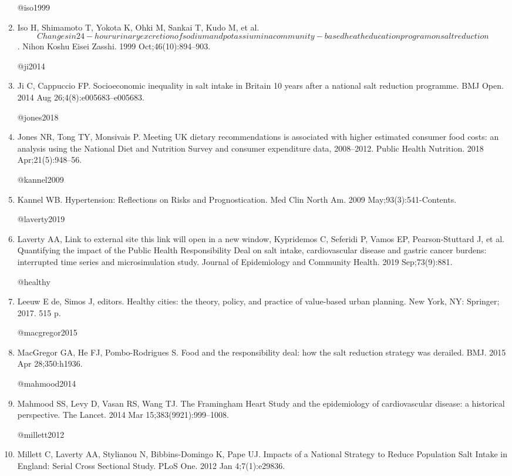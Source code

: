 \documentclass[
]{article}
\begin{document}
\begin{enumerate}
  @iso1999
\item
  Iso H, Shimamoto T, Yokota K, Ohki M, Sankai T, Kudo M, et
  al.~\[Changes in 24-hour urinary excretion of sodium and potassium in a community-based heath education program on salt reduction\].
  Nihon Koshu Eisei Zasshi. 1999 Oct;46(10):894--903.

  @ji2014
\item
  Ji C, Cappuccio FP. Socioeconomic inequality in salt intake in Britain
  10 years after a national salt reduction programme. BMJ Open. 2014 Aug
  26;4(8):e005683--e005683.

  @jones2018
\item
  Jones NR, Tong TY, Monsivais P. Meeting UK dietary recommendations is
  associated with higher estimated consumer food costs: an analysis
  using the National Diet and Nutrition Survey and consumer expenditure
  data, 2008--2012. Public Health Nutrition. 2018 Apr;21(5):948--56.

  @kannel2009
\item
  Kannel WB. Hypertension: Reflections on Risks and Prognostication. Med
  Clin North Am. 2009 May;93(3):541-Contents.

  @laverty2019
\item
  Laverty AA, Link to external site this link will open in a new window,
  Kypridemos C, Seferidi P, Vamos EP, Pearson-Stuttard J, et al.
  Quantifying the impact of the Public Health Responsibility Deal on
  salt intake, cardiovascular disease and gastric cancer burdens:
  interrupted time series and microsimulation study. Journal of
  Epidemiology and Community Health. 2019 Sep;73(9):881.

  @healthy
\item
  Leeuw E de, Simos J, editors. Healthy cities: the theory, policy, and
  practice of value-based urban planning. New York, NY: Springer; 2017.
  515 p.

  @macgregor2015
\item
  MacGregor GA, He FJ, Pombo-Rodrigues S. Food and the responsibility
  deal: how the salt reduction strategy was derailed. BMJ. 2015 Apr
  28;350:h1936.

  @mahmood2014
\item
  Mahmood SS, Levy D, Vasan RS, Wang TJ. The Framingham Heart Study and
  the epidemiology of cardiovascular disease: a historical perspective.
  The Lancet. 2014 Mar 15;383(9921):999--1008.

  @millett2012
\item
  Millett C, Laverty AA, Stylianou N, Bibbins-Domingo K, Pape UJ.
  Impacts of a National Strategy to Reduce Population Salt Intake in
  England: Serial Cross Sectional Study. PLoS One. 2012 Jan
  4;7(1):e29836.


\end{enumerate}
\end{document}
